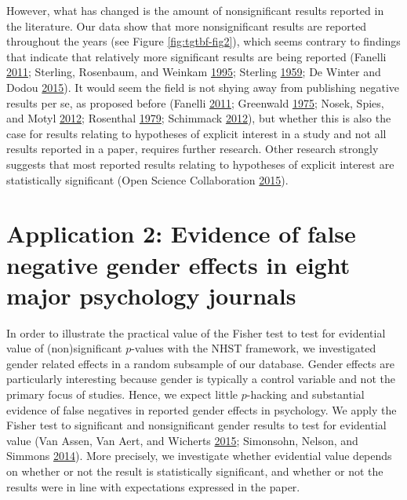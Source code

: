 \documentclass[a5paper]{book}
\begin{document}
However, what has changed is the amount of nonsignificant results
reported in the literature. Our data show that more nonsignificant
results are reported throughout the years (see Figure
\ref{fig:tgtbf-fig2}), which seems contrary to findings that indicate
that relatively more significant results are being reported (Fanelli
\protect\hyperlink{ref-doi:10.1007ux2fs11192-011-0494-7}{2011};
Sterling, Rosenbaum, and Weinkam
\protect\hyperlink{ref-doi:10.2307ux2f2684823}{1995}; Sterling
\protect\hyperlink{ref-doi:10.2307ux2f2282137}{1959}; De Winter and
Dodou \protect\hyperlink{ref-doi:10.7717ux2fpeerj.733}{2015}). It would
seem the field is not shying away from publishing negative results per
se, as proposed before (Fanelli
\protect\hyperlink{ref-doi:10.1007ux2fs11192-011-0494-7}{2011};
Greenwald \protect\hyperlink{ref-doi:10.1037ux2fh0076157}{1975}; Nosek,
Spies, and Motyl
\protect\hyperlink{ref-doi:10.1177ux2f1745691612459058}{2012}; Rosenthal
\protect\hyperlink{ref-doi:10.1037ux2f0033-2909.86.3.638}{1979};
Schimmack \protect\hyperlink{ref-doi:10.1037ux2fa0029487}{2012}), but
whether this is also the case for results relating to hypotheses of
explicit interest in a study and not all results reported in a paper,
requires further research. Other research strongly suggests that most
reported results relating to hypotheses of explicit interest are
statistically significant (Open Science Collaboration
\protect\hyperlink{ref-doi:10.1126ux2fscience.aac4716}{2015}).

\section{Application 2: Evidence of false negative gender effects in
eight major psychology
journals}\label{application-2-evidence-of-false-negative-gender-effects-in-eight-major-psychology-journals}

In order to illustrate the practical value of the Fisher test to test
for evidential value of (non)significant \(p\)-values with the NHST
framework, we investigated gender related effects in a random subsample
of our database. Gender effects are particularly interesting because
gender is typically a control variable and not the primary focus of
studies. Hence, we expect little \(p\)-hacking and substantial evidence
of false negatives in reported gender effects in psychology. We apply
the Fisher test to significant and nonsignificant gender results to test
for evidential value (Van Assen, Van Aert, and Wicherts
\protect\hyperlink{ref-doi:10.1037ux2fmet0000025}{2015}; Simonsohn,
Nelson, and Simmons
\protect\hyperlink{ref-doi:10.1037ux2fa0033242}{2014}). More precisely,
we investigate whether evidential value depends on whether or not the
result is statistically significant, and whether or not the results were
in line with expectations expressed in the paper.
\end{document}
